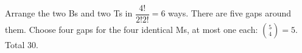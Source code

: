 Arrange the two Bs and two Ts in $\dfrac{4!}{2!2!}=6$ ways. There are five gaps around them. Choose four gaps for the four identical Ms, at most one each: $\binom54=5$. Total $\boxed{30}$.
